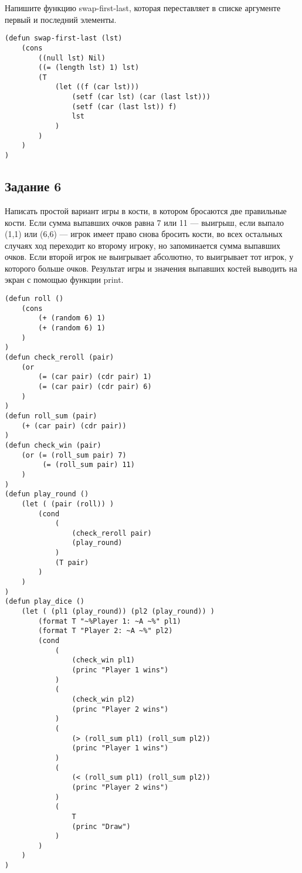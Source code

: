 Напишите функцию swap-first-last, которая переставляет в списке аргументе первый и последний элементы.

\begin{lstlisting}
(defun swap-first-last (lst)
    (cons
        ((null lst) Nil)
        ((= (length lst) 1) lst)
        (T
            (let ((f (car lst)))
                (setf (car lst) (car (last lst)))
                (setf (car (last lst)) f)
                lst
            )
        )
    )
)
\end{lstlisting}

\subsection*{Задание 6}

Написать простой вариант игры в кости, в котором бросаются две правильные кости. Если сумма выпавших очков равна 7 или 11 — выигрыш, если выпало (1,1) или (6,6) — игрок имеет право снова бросить кости, во всех остальных случаях ход переходит ко второму игроку, но запоминается сумма выпавших очков. Если второй игрок не выигрывает абсолютно, то выигрывает тот игрок, у которого больше очков. Результат игры и значения выпавших костей выводить на экран с помощью функции print. 

\begin{lstlisting}
(defun roll ()
    (cons
        (+ (random 6) 1)
        (+ (random 6) 1)
    )
)
(defun check_reroll (pair)
    (or
        (= (car pair) (cdr pair) 1)
        (= (car pair) (cdr pair) 6)
    )
)
(defun roll_sum (pair)
    (+ (car pair) (cdr pair))
)
(defun check_win (pair)
    (or (= (roll_sum pair) 7)
         (= (roll_sum pair) 11)
    )
)
(defun play_round ()
    (let ( (pair (roll)) )
        (cond
            (
                (check_reroll pair)
                (play_round)
            )
            (T pair)
        )
    )
)
(defun play_dice ()
    (let ( (pl1 (play_round)) (pl2 (play_round)) )
        (format T "~%Player 1: ~A ~%" pl1)
        (format T "Player 2: ~A ~%" pl2)
        (cond
            (
                (check_win pl1)
                (princ "Player 1 wins")
            )
            (
                (check_win pl2)
                (princ "Player 2 wins")
            )
            (
                (> (roll_sum pl1) (roll_sum pl2))
                (princ "Player 1 wins")
            )
            (
                (< (roll_sum pl1) (roll_sum pl2))
                (princ "Player 2 wins")
            )
            (
                T
                (princ "Draw")
            )
        )
    )
)
\end{lstlisting}


